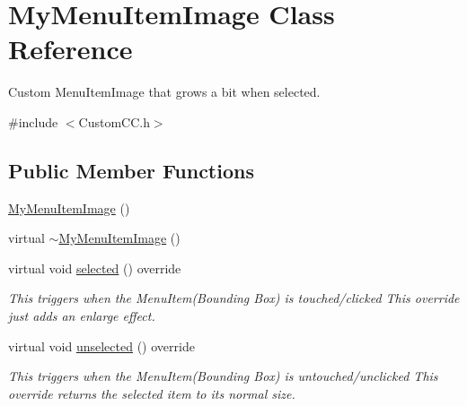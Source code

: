 \hypertarget{class_my_menu_item_image}{\section{\-My\-Menu\-Item\-Image \-Class \-Reference}
\label{class_my_menu_item_image}
}


\-Custom \-Menu\-Item\-Image that grows a bit when selected.  




{\ttfamily \#include $<$\-Custom\-C\-C.\-h$>$}

\subsection*{\-Public \-Member \-Functions}
\begin{DoxyCompactItemize}
\item 
\hyperlink{class_my_menu_item_image_ab48e8ecdbca431e518bebbed846ddf1e}{\-My\-Menu\-Item\-Image} ()
\item 
virtual \hyperlink{class_my_menu_item_image_aa44719255783a10c961c8220a29de788}{$\sim$\-My\-Menu\-Item\-Image} ()
\item 
virtual void \hyperlink{class_my_menu_item_image_afe0adf7ee40fbfd6443000f6ead06d6b}{selected} () override
\begin{DoxyCompactList}\small\item\em \-This triggers when the \-Menu\-Item(\-Bounding Box) is touched/clicked \-This override just adds an enlarge effect. \end{DoxyCompactList}\item 
virtual void \hyperlink{class_my_menu_item_image_abaf8a603722b33a093ecaa3d36df7c10}{unselected} () override
\begin{DoxyCompactList}\small\item\em \-This triggers when the \-Menu\-Item(\-Bounding Box) is untouched/unclicked \-This override returns the selected item to its normal size. \end{DoxyCompactList}\end{DoxyCompactItemize}
